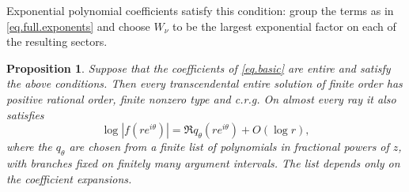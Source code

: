 \documentclass[a4paper,12pt]{article}
\newtheorem{proposition}[defin]{Proposition}
\numberwithin{equation}{section}
\begin{document}
Exponential polynomial coefficients satisfy this condition: group the
terms as in \eqref{eq.full.exponents} and choose $W_\nu$ to be the largest
exponential factor on each of the resulting sectors.

\begin{proposition}\label{prop.puiseux}
Suppose that the coefficients of \eqref{eq.basic} are entire and satisfy
the above conditions. Then every transcendental entire solution
of finite order has positive rational order, finite nonzero type and
\textit{c.r.g}. On almost every ray it also satisfies
\begin{equation}\label{eq.puiseux.ray}
 \log|f(re^{i\theta})|=\Re q_\theta(re^{i\theta})+O(\log r),
\end{equation}
where the $q_\theta$ are chosen from a finite list of polynomials in
fractional powers of $z$, with branches fixed on finitely many argument
intervals. The list depends only on the coefficient expansions.
\end{proposition}
\end{document}
